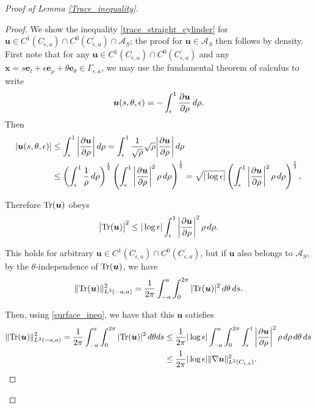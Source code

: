 \documentclass[11pt]{article}
\numberwithin{equation}{section}
\newcommand{\A}{\mathcal{A}}
\newcommand{\bu}{\bm{u}}
\newcommand{\bx}{\bm{x}}
\newcommand{\be}{\bm{e}}
\newcommand{\p}{\partial}
\newcommand{\ts}{\thinspace}
\theoremstyle{definition}
\begin{document}
\begin{proof}[Proof of Lemma \ref{Trace_inequality}]
\begin{proof}
We show the inequality \eqref{trace_straight_cylinder} for $\bu\in C^1(C_{\epsilon,a})\cap C^0(\overline{C_{\epsilon,a}})\cap \A_S$; the proof for $\bu\in \A_S$ then follows by density. \\

First note that for any $\bu\in C^1(C_{\epsilon,a})\cap C^0(\overline{C_{\epsilon,a}})$ and any $\bx = s\be_t +\epsilon\be_{\rho} + \theta\be_\theta \in \Gamma_{\epsilon,a}$, we may use the fundamental theorem of calculus to write
\[ \bu(s,\theta,\epsilon) = - \int_{\epsilon}^1 \frac{\p \bu}{\p \rho} \ts d\rho. \]
Then
\begin{align*}
|\bu(s,\theta,\epsilon)| &\le \int_{\epsilon}^{1} \bigg|\frac{\p \bu}{\p\rho} \bigg|\ts d\rho = \int_{\epsilon}^{1} \frac{1}{\sqrt{\rho}}\sqrt{\rho} \bigg|\frac{\p \bu}{\p\rho} \bigg|\ts d\rho \\
&\le \left(\int_{\epsilon}^{1} \frac{1}{\rho} \ts d\rho\right)^{\frac{1}{2}} \left(\int_{\epsilon}^{1} \bigg|\frac{\p \bu}{\p\rho} \bigg|^2 \ts \rho \ts d\rho\right)^{\frac{1}{2}} = \sqrt{|\log\epsilon|}\left(\int_{\epsilon}^{1} \bigg|\frac{\p \bu}{\p\rho} \bigg|^2 \ts \rho \ts d\rho\right)^{\frac{1}{2}}.
\end{align*}

Therefore ${\rm Tr}(\bu)$ obeys
\begin{equation}\label{surface_ineq}
\big|{\rm Tr}(\bu)\big|^2 \le |\log \epsilon| \int_{\epsilon}^1\bigg|\frac{\p \bu}{\p\rho} \bigg|^2 \ts \rho \ts d\rho.
\end{equation}

This holds for arbitrary $\bu \in C^1(C_{\epsilon,a})\cap C^0(\overline{C_{\epsilon,a}})$, but if $\bu$ also belongs to $\A_S$, by the $\theta$-independence of ${\rm Tr}(\bu)$, we have
\[\|{\rm Tr}(\bu)\|_{L^2(-a,a)}^2 = \frac{1}{2\pi}\int_{-a}^a \int_0^{2\pi} |{\rm Tr}(\bu)|^2 \ts d\theta \ts ds.\]

Then, using \eqref{surface_ineq}, we have that this $\bu$ satisfies
\begin{align*}
\|{\rm Tr}(\bu)\|_{L^2(-a,a)}^2 = \frac{1}{2\pi}\int_{-a}^a\int_0^{2\pi} |{\rm Tr}(\bu)|^2 \ts d\theta ds &\le \frac{1}{2\pi}|\log \epsilon| \int_{-a}^a\int_0^{2\pi}\int_{\epsilon}^1 \bigg| \frac{\p \bu}{\p \rho} \bigg|^2 \ts \rho \ts d\rho \ts d\theta\ts ds \\
& \le \frac{1}{2\pi}|\log \epsilon| \|\nabla \bu\|_{L^2(C_{\epsilon,a})}^2.
\end{align*}
\end{proof}


\end{proof}
\end{document}
